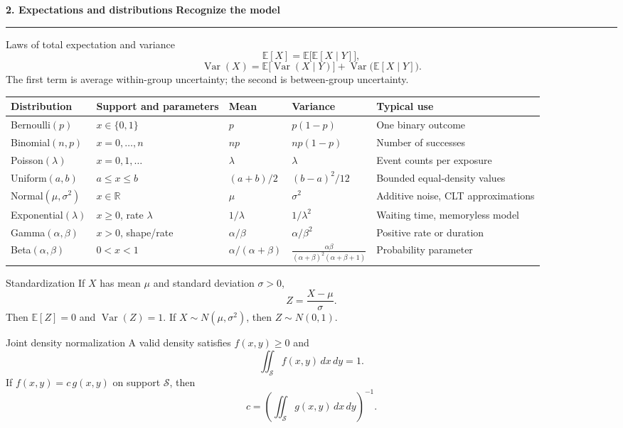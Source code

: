 \documentclass[10pt,a4paper]{article}
\newcommand{\sectionbanner}[2]{%
  \vspace{2mm}
  {\color{navy}\Large\bfseries #1}\hfill
  {\color{blue}\bfseries #2}
  \par\vspace{1mm}\color{line}\rule{\linewidth}{0.8pt}\color{ink}\vspace{2mm}
}
\newcommand{\E}{\mathbb{E}}
\newcommand{\Var}{\operatorname{Var}}
\newcommand{\R}{\mathbb{R}}
\begin{document}
\newpage
\sectionbanner{2. Expectations and distributions}{Recognize the model}

\begin{formulabox}{Laws of total expectation and variance}
\[
\E[X]=\E\bigl[\E[X\mid Y]\bigr],
\]
\[
\Var(X)=\E\bigl[\Var(X\mid Y)\bigr]
+\Var\bigl(\E[X\mid Y]\bigr).
\]
The first term is average within-group uncertainty; the second is between-group uncertainty.
\end{formulabox}

\small
\begin{longtable}{@{}p{25mm}p{34mm}p{30mm}p{31mm}p{35mm}@{}}
\toprule
Distribution & Support and parameters & Mean & Variance & Typical use \\
\midrule
\endhead
Bernoulli$(p)$ & $x\in\{0,1\}$ & $p$ & $p(1-p)$ & One binary outcome \\
Binomial$(n,p)$ & $x=0,\ldots,n$ & $np$ & $np(1-p)$ & Number of successes \\
Poisson$(\lambda)$ & $x=0,1,\ldots$ & $\lambda$ & $\lambda$ & Event counts per exposure \\
Uniform$(a,b)$ & $a\le x\le b$ & $(a+b)/2$ & $(b-a)^2/12$ & Bounded equal-density values \\
Normal$(\mu,\sigma^2)$ & $x\in\R$ & $\mu$ & $\sigma^2$ & Additive noise, CLT approximations \\
Exponential$(\lambda)$ & $x\ge0$, rate $\lambda$ & $1/\lambda$ & $1/\lambda^2$ & Waiting time, memoryless model \\
Gamma$(\alpha,\beta)$ & $x>0$, shape/rate & $\alpha/\beta$ & $\alpha/\beta^2$ & Positive rate or duration \\
Beta$(\alpha,\beta)$ & $0<x<1$ & $\alpha/(\alpha+\beta)$ & $\frac{\alpha\beta}{(\alpha+\beta)^2(\alpha+\beta+1)}$ & Probability parameter \\
\bottomrule
\end{longtable}
\normalsize

\begin{formulabox}{Standardization}
If $X$ has mean $\mu$ and standard deviation $\sigma>0$,
\[
Z=\frac{X-\mu}{\sigma}.
\]
Then $\E[Z]=0$ and $\Var(Z)=1$. If $X\sim N(\mu,\sigma^2)$, then $Z\sim N(0,1)$.
\end{formulabox}

\begin{formulabox}{Joint density normalization}
A valid density satisfies $f(x,y)\ge0$ and
\[
\iint_{\mathcal S}f(x,y)\,dx\,dy=1.
\]
If $f(x,y)=c\,g(x,y)$ on support $\mathcal S$, then
\[
c=\left(\iint_{\mathcal S}g(x,y)\,dx\,dy\right)^{-1}.
\]
\end{formulabox}
\end{document}
